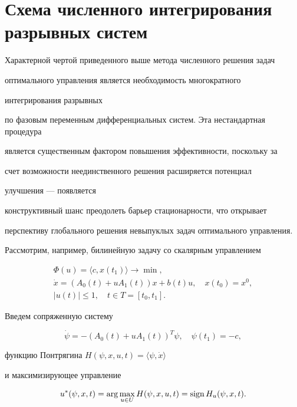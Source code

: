 \section{Схема численного интегрирования разрывных систем}





Характерной чертой приведенного выше метода численного решения задач 


оптимального управления является необходимость многократного 


интегрирования разрывных 


по фазовым переменным дифференциальных систем. Эта нестандартная процедура 


является существенным фактором повышения эффективности, поскольку за 


счет возможности неединственного решения расширяется потенциал 


улучшения --- появляется 


конструктивный шанс преодолеть барьер стационарности, что открывает 


перспективу глобального решения невыпуклых задач оптимального управления.





Рассмотрим, например, билинейную задачу со скалярным управлением


\begin{gather*}


\Phi(u)=\langle c,x(t_1)\rangle \rightarrow \min,\\


\Dot{x}=(A_0(t)+uA_1(t))x+b(t)u,\quad x(t_0)=x^0,\\


|u(t)|\leq 1,\quad t\in T=[t_0,t_1].


\end{gather*} 


Введем сопряженную систему


$$


\Dot{\psi}=-(A_0(t)+uA_1(t))^T\psi,\quad \psi(t_1)=-c,


$$ 


функцию Понтрягина $H(\psi,x,u,t)=\langle\psi,\Dot{x}\rangle$ 


и максимизирующее управление


$$


u^*(\psi,x,t)=\arg\max_{u\in U}H(\psi,x,u,t)=\sign H_u(\psi,x,t).


$$ 


